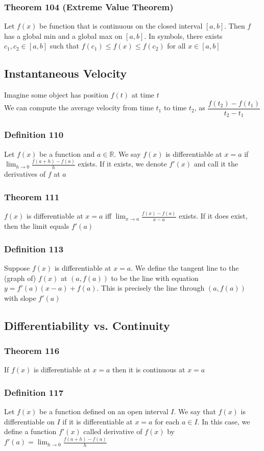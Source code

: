 \documentclass[12pt, letterpaper]{article}
\begin{document}
\subsubsection*{Theorem 104 (Extreme Value Theorem)}
Let $f(x)$ be function that is continuous on the closed interval $[a,b]$. Then $f$ has a global min and a global max
on $[a,b]$. In symbols, there exists $c_1, c_2 \in [a,b]$ such that $f(c_1) \leq f(x) \leq f(c_2)$ for all $x\in[a,b]$
\subsection{Instantaneous Velocity}
Imagine some object has position $f(t)$ at time $t$ \\ 
We can compute the average velocity from time $t_1$ to time $t_2$, as $\dfrac{f(t_2) - f(t_1)}{t_2 - t_1}$
\subsubsection*{Definition 110}
Let $f(x)$ be a function and $a\in\mathbb{R}$. We say $f(x)$ is differentiable at $x=a$ if $\displaystyle\lim_{h\to 0} \frac{f(a+h) - f(a)}{h}$
exists. If it exists, we denote $f'(x)$ and call it the derivatives of $f$ at $a$
\subsubsection*{Theorem 111}
$f(x)$ is differentiable at $x=a$ iff $\displaystyle\lim_{x\to a} \frac{f(x) - f(a)}{x-a}$ exists. If it does
exist, then the limit equals $f'(a)$
\subsubsection*{Definition 113}
Suppose $f(x)$ is differentiable at $x=a$. We define the tangent line to the (graph of) $f(x)$ at $(a, f(a))$ to be the
line with equation $y=f'(a)(x-a) + f(a)$. This is precisely the line through $(a,f(a))$ with slope $f'(a)$
\subsection{Differentiability vs. Continuity}
\subsubsection*{Theorem 116}
If $f(x)$ is differentiable at $x=a$ then it is continuous at $x=a$
\subsubsection*{Definition 117}
Let $f(x)$ be a function defined on an open interval $I$. We say that $f(x)$ is differentiable on $I$ if it is differentiable
at $x=a$ for each $a\in I$. In this case, we define a function $f'(x)$ called derivative of $f(x)$ by 
$f'(a) = \displaystyle\lim_{h\to 0} \frac{f(a+h) - f(a)}{h}$
\end{document}
